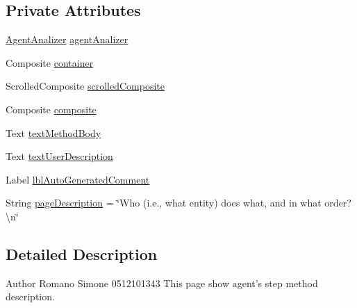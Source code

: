 \subsection*{Private Attributes}
\begin{DoxyCompactItemize}
\item 
\hyperlink{classit_1_1isislab_1_1masonassisteddocumentation_1_1mason_1_1analizer_1_1_agent_analizer}{Agent\-Analizer} \hyperlink{classit_1_1isislab_1_1masonassisteddocumentation_1_1mason_1_1wizards_1_1_l___step_method_page_ad5fe05afd95ed6f23ede53109ae21735}{agent\-Analizer}
\item 
Composite \hyperlink{classit_1_1isislab_1_1masonassisteddocumentation_1_1mason_1_1wizards_1_1_l___step_method_page_ab20403475340d7e5a95cdb4a1f9e0b3c}{container}
\item 
Scrolled\-Composite \hyperlink{classit_1_1isislab_1_1masonassisteddocumentation_1_1mason_1_1wizards_1_1_l___step_method_page_a318f8c83456bbb4b81cc63dff370bf7b}{scrolled\-Composite}
\item 
Composite \hyperlink{classit_1_1isislab_1_1masonassisteddocumentation_1_1mason_1_1wizards_1_1_l___step_method_page_ad8812271bc4da1c3b7d4e415d45e875d}{composite}
\item 
Text \hyperlink{classit_1_1isislab_1_1masonassisteddocumentation_1_1mason_1_1wizards_1_1_l___step_method_page_a1a505af315bac0ab33bc17ae6f9f5d76}{text\-Method\-Body}
\item 
Text \hyperlink{classit_1_1isislab_1_1masonassisteddocumentation_1_1mason_1_1wizards_1_1_l___step_method_page_a6c692d610f837c964e1f6f0c8c89244c}{text\-User\-Description}
\item 
Label \hyperlink{classit_1_1isislab_1_1masonassisteddocumentation_1_1mason_1_1wizards_1_1_l___step_method_page_ae387c5a1c2bc2000a32d76fa15d5002f}{lbl\-Auto\-Generated\-Comment}
\item 
String \hyperlink{classit_1_1isislab_1_1masonassisteddocumentation_1_1mason_1_1wizards_1_1_l___step_method_page_ab95c2d48945aa3a3be852aa54c775f8b}{page\-Description} = \char`\"{}Who (i.\-e., what entity) does what, and in what order?\textbackslash{}n\char`\"{}
\end{DoxyCompactItemize}


\subsection{Detailed Description}
\begin{DoxyAuthor}{Author}
Romano Simone 0512101343 This page show agent's step method description. 
\end{DoxyAuthor}



